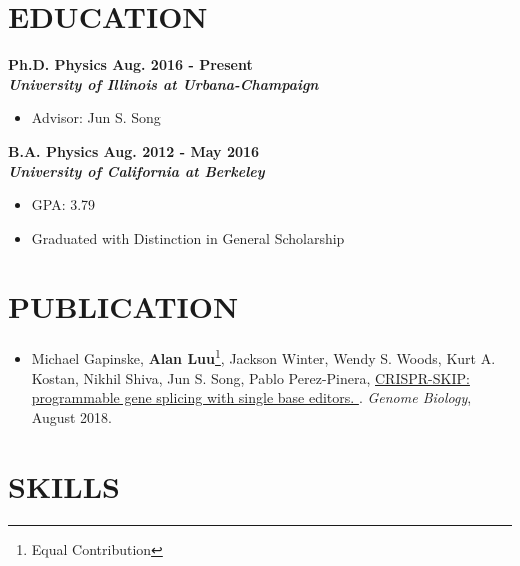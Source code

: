 \documentclass[margin, 10pt]{res} %
\begin{document}
\begin{resume}


\section{EDUCATION}

\bf{Ph.D. Physics} \hfill Aug. 2016 - Present\\
{\sl University of Illinois at Urbana-Champaign}

\begin{itemize}
\item {\normalfont Advisor: Jun S. Song}
\end{itemize}

\bf{B.A. Physics} \hfill Aug. 2012 - May 2016 \\
{\sl University of California at Berkeley}

\begin{itemize}
\item {\normalfont GPA: 3.79}
\item {\normalfont Graduated with Distinction in General Scholarship}
\end{itemize}

\section{PUBLICATION}
\begin{itemize}[leftmargin=0in,label={}]
\item Michael Gapinske, \textbf{Alan Luu}\footnote{Equal Contribution}, Jackson Winter, Wendy S. Woods, Kurt A. Kostan, Nikhil Shiva, Jun S. Song, Pablo Perez-Pinera, \href{https://www.ncbi.nlm.nih.gov/pmc/articles/PMC6092781/}{CRISPR-SKIP: programmable gene splicing with single base editors.
}. \textit{Genome Biology}, August 2018.

\end{itemize}
\section{SKILLS}



\end{resume}
\end{document}
